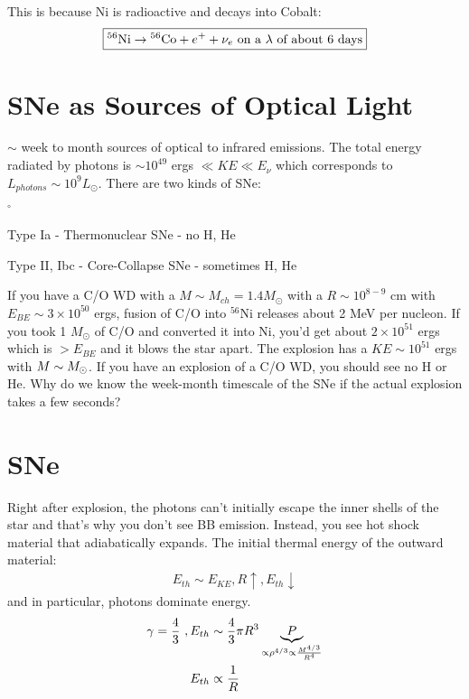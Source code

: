 This is because Ni is radioactive and decays into Cobalt:
\begin{align}
\boxed{ \textrm{$^{56}$Ni} \rightarrow \textrm{$^{56}$Co} + e^+ + \nu_e\textrm{ on a $\lambda$ of about 6 days}}
\end{align}

\section{SNe as Sources of Optical Light}

$\sim$ week to month sources of optical to infrared emissions. The total energy radiated by photons is $\sim 10^{49} $ ergs $\ll KE \ll E_\nu$ which corresponds to $L_{photons} \sim 10^9 L_\odot$. There are two kinds of SNe:

\begin{list}{$^\circ$}{}
\item Type Ia - Thermonuclear SNe - no H, He
\item Type II, Ibc - Core-Collapse SNe - sometimes H, He
\end{list}

If you have a C/O WD with a $M \sim M_{ch} = 1.4 M_\odot$ with a $R \sim 10^{8-9}$ cm with $E_{BE} \sim 3 \times 10^{50}$ ergs, fusion of C/O into $^{56}$Ni releases about 2 MeV per nucleon. If you took 1 $M_\odot$ of C/O and converted it into Ni, you'd get about $2 \times 10^{51}$ ergs which is $> E_{BE}$ and it blows the star apart. The explosion has a $KE \sim 10^{51}$ ergs with $M \sim M_\odot$. If you have an explosion of a C/O WD, you should see no H or He. Why do we know the week-month timescale of the SNe if the actual explosion takes a few seconds? 

\section{SNe}

Right after explosion, the photons can't initially escape the inner shells of the star and that's why you don't see BB emission. Instead, you see hot shock material that adiabatically expands. The initial thermal energy of the outward material:
\begin{align}
E_{th} \sim E_{KE},R \uparrow, E_{th} \downarrow
\end{align}
and in particular, photons dominate energy.
\begin{align}
\gamma = \frac{4}{3}~, E_{th} &\sim \frac{4}{3}\pi R^3 \underbrace{P}_{\propto \rho^{4/3} \propto \frac{M^{4/3}}{R^4}}\\
E_{th} &\propto \frac{1}{R}
\end{align}

